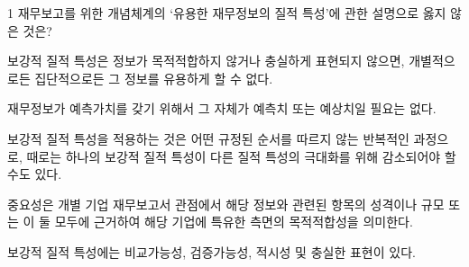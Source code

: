 \begin{question}{1}
재무보고를 위한 개념체계의 ‘유용한 재무정보의 질적 특성’에 관한 설명으로 옳지 않은 것은?
\begin{choices}
  \item 보강적 질적 특성은 정보가 목적적합하지 않거나 충실하게 표현되지 않으면, 개별적으로든 집단적으로든 그 정보를 유용하게 할 수 없다.
  \item 재무정보가 예측가치를 갖기 위해서 그 자체가 예측치 또는 예상치일 필요는 없다.
  \item 보강적 질적 특성을 적용하는 것은 어떤 규정된 순서를 따르지 않는 반복적인 과정으로, 때로는 하나의 보강적 질적 특성이 다른 질적 특성의 극대화를 위해 감소되어야 할 수도 있다.
  \item 중요성은 개별 기업 재무보고서 관점에서 해당 정보와 관련된 항목의 성격이나 규모 또는 이 둘 모두에 근거하여 해당 기업에 특유한 측면의 목적적합성을 의미한다.
  \item 보강적 질적 특성에는 비교가능성, 검증가능성, 적시성 및 충실한 표현이 있다.
\end{choices}
\end{question}
